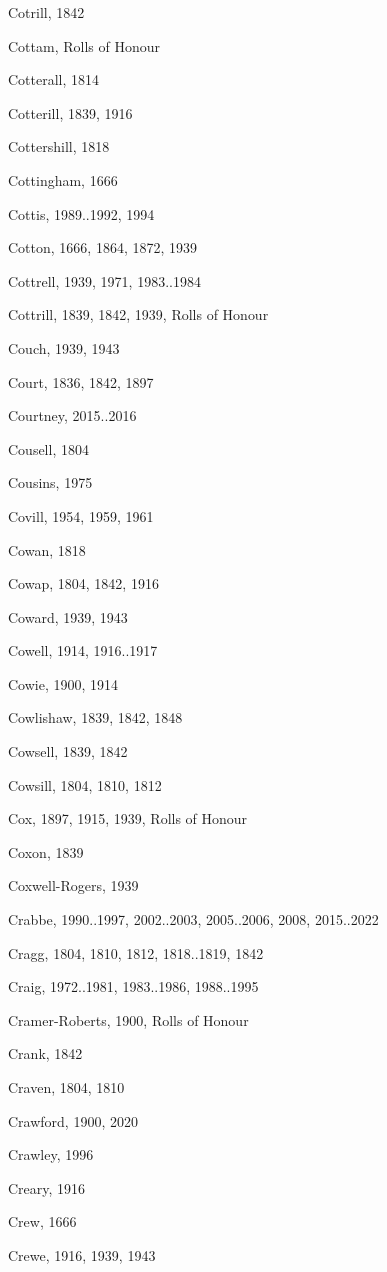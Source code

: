 {\begin{theindex}
\item Cotrill, 1842
\item Cottam, Rolls of Honour
\item Cotterall, 1814
\item Cotterill, 1839, 1916
\item Cottershill, 1818
\item Cottingham, 1666
\item Cottis, 1989..1992, 1994
\item Cotton, 1666, 1864, 1872, 1939
\item Cottrell, 1939, 1971, 1983..1984
\item Cottrill, 1839, 1842, 1939, Rolls of Honour
\item Couch, 1939, 1943
\item Court, 1836, 1842, 1897
\item Courtney, 2015..2016
\item Cousell, 1804
\item Cousins, 1975
\item Covill, 1954, 1959, 1961
\item Cowan, 1818
\item Cowap, 1804, 1842, 1916
\item Coward, 1939, 1943
\item Cowell, 1914, 1916..1917
\item Cowie, 1900, 1914
\item Cowlishaw, 1839, 1842, 1848
\item Cowsell, 1839, 1842
\item Cowsill, 1804, 1810, 1812
\item Cox, 1897, 1915, 1939, Rolls of Honour
\item Coxon, 1839
\item Coxwell-Rogers, 1939
\item Crabbe, 1990..1997, 2002..2003, 2005..2006, 2008, 2015..2022
\item Cragg, 1804, 1810, 1812, 1818..1819, 1842
\item Craig, 1972..1981, 1983..1986, 1988..1995
\item Cramer-Roberts, 1900, Rolls of Honour
\item Crank, 1842
\item Craven, 1804, 1810
\item Crawford, 1900, 2020
\item Crawley, 1996
\item Creary, 1916
\item Crew, 1666
\item Crewe, 1916, 1939, 1943

\end{theindex}}
